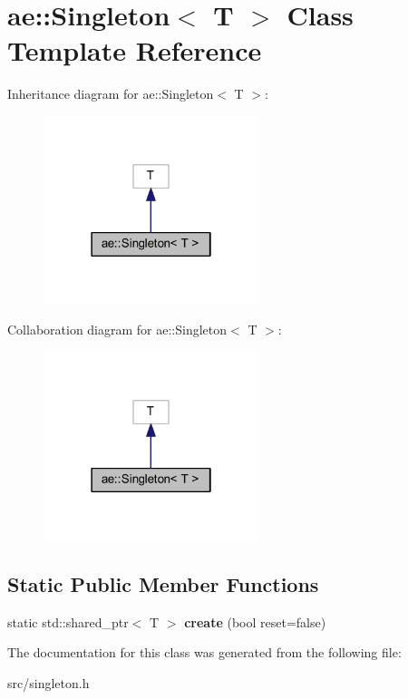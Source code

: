 \hypertarget{classae_1_1_singleton}{}\section{ae\+:\+:Singleton$<$ T $>$ Class Template Reference}
\label{classae_1_1_singleton}


Inheritance diagram for ae\+:\+:Singleton$<$ T $>$\+:\nopagebreak
\begin{figure}[H]
\begin{center}
\leavevmode
\includegraphics[width=178pt]{classae_1_1_singleton__inherit__graph}
\end{center}
\end{figure}


Collaboration diagram for ae\+:\+:Singleton$<$ T $>$\+:\nopagebreak
\begin{figure}[H]
\begin{center}
\leavevmode
\includegraphics[width=178pt]{classae_1_1_singleton__coll__graph}
\end{center}
\end{figure}
\subsection*{Static Public Member Functions}
\begin{DoxyCompactItemize}
\item 
\hypertarget{classae_1_1_singleton_abc6b9a3fe47623032128dd1963db9a7b}{}\label{classae_1_1_singleton_abc6b9a3fe47623032128dd1963db9a7b} 
static std\+::shared\+\_\+ptr$<$ T $>$ {\bfseries create} (bool reset=false)
\end{DoxyCompactItemize}


The documentation for this class was generated from the following file\+:\begin{DoxyCompactItemize}
\item 
src/singleton.\+h\end{DoxyCompactItemize}
